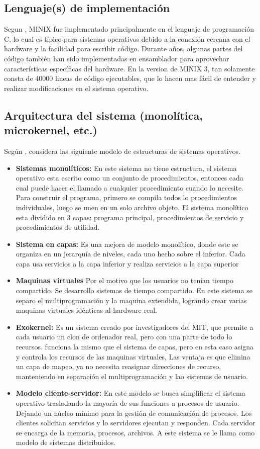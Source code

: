 \subsection{Lenguaje(s) de implementación}
Segun \citep{tanenbaum2006}, MINIX fue implementado principalmente en el lenguaje de programación C, lo cual es típico para sistemas operativos debido a la conexión cercana con el hardware y la facilidad
para escribir código. Durante años, algunas partes del código también han sido implementadas en ensamblador para aprovechar características específicas del 
hardware. En la version de MINIX 3, tan solamente consta de 40000 lineas de código ejecutables, que lo hacen mas fácil de entender y realizar modificaciones en el sistema operativo.

\subsection{Arquitectura del sistema (monolítica, microkernel, etc.)}
Según \citep[pag. 42--51 ]{tanenbaum2006}, considera las siguiente modelo de estructuras de sistemas operativos.
\begin{itemize}
    \item \textbf{Sistemas monolíticos:} En este sistema no tiene estructura, el sistema operativo esta escrito como un conjunto de procedimientos, entonces cada cual puede hacer el llamado a cualquier procedimiento cuando lo necesite.
    Para construir el programa, primero se compila todos lo procedimientos individuales, luego se unen en un solo archivo objeto. El sistema monolítico esta dividido en 3 capas: programa principal, procedimientos de servicio y procedimientos de utilidad.
    \item \textbf{Sistema en capas:} Es una mejora de modelo monolítico, donde este se organiza en un jerarquía de niveles, cada uno hecho sobre el inferior. Cada capa usa servicios a la capa inferior y realiza servicios a la capa superior
    \item \textbf{Maquinas virtuales} Por el motivo que los usuarios no tenían tiempo compartido. Se desarrollo sistemas de tiempo compartido. En este sistema se separo el multiprogramación y la maquina extendida, logrando crear varias maquinas virtuales idénticas al hardware real.
    \item \textbf{Exokernel:} Es un sistema creado por investigadores del MIT, que permite a cada usuario un clon de ordenador real, pero con una parte de todo lo recursos. funciona la mismo que el sistema de capas, pero en esta caso asigna y controla los recursos de las maquinas virtuales,
    Las ventaja es que elimina un capa de mapeo, ya no necesita reasignar direcciones de recurso, manteniendo en separación el multiprogramación y lao sistemas de usuario.
    \item \textbf{Modelo cliente-servidor:} En este modelo se busca simplificar el sistema operativo trasladando la mayoría de sus funciones a procesos de usuario. Dejando un núcleo mínimo para la gestión de comunicación de procesos. Los clientes solicitan servicios y lo servidores ejecutan y responden. Cada servidor se encarga de la memoria, procesos, archivos. A este sistema se le llama como modelo de sistemas distribuidos.
\end{itemize}
